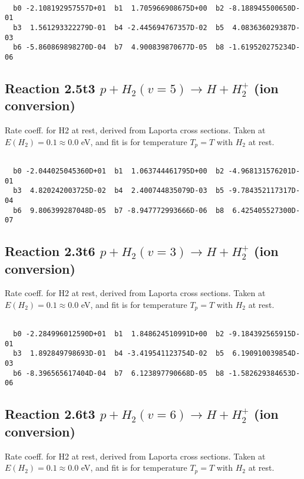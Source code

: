 \begin{small}\begin{verbatim}

  b0 -2.108192957557D+01  b1  1.705966908675D+00  b2 -8.188945500650D-01
  b3  1.561293322279D-01  b4 -2.445694767357D-02  b5  4.083636029387D-03
  b6 -5.860869898270D-04  b7  4.900839870677D-05  b8 -1.619520275234D-06

\end{verbatim}\end{small}

\newpage
\subsection{
Reaction 2.5t3
$ p + H_2(v=5) \rightarrow H + H_2^+$ (ion conversion)
}
Rate coeff. for H2 at rest, derived from Laporta cross sections.
Taken at $E(H_2) = 0.1 \approx 0.0$ eV,  and fit is for temperature $T_p=T$ with $H_2$ at rest.

\begin{small}\begin{verbatim}

  b0 -2.044025045360D+01  b1  1.063744461795D+00  b2 -4.968131576201D-01
  b3  4.820242003725D-02  b4  2.400744835079D-03  b5 -9.784352117317D-04
  b6  9.806399287048D-05  b7 -8.947772993666D-06  b8  6.425405527300D-07

\end{verbatim}\end{small}

\newpage
\subsection{
Reaction 2.3t6
$ p + H_2(v=3) \rightarrow H + H_2^+$ (ion conversion)
}
Rate coeff. for H2 at rest, derived from Laporta cross sections.
Taken at $E(H_2) = 0.1 \approx 0.0$ eV,  and fit is for temperature $T_p=T$ with $H_2$ at rest.

\begin{small}\begin{verbatim}

  b0 -2.284996012590D+01  b1  1.848624510991D+00  b2 -9.184392565915D-01
  b3  1.892849798693D-01  b4 -3.419541123754D-02  b5  6.190910039854D-03
  b6 -8.396565617404D-04  b7  6.123897790668D-05  b8 -1.582629384653D-06

\end{verbatim}\end{small}

\newpage
\subsection{
Reaction 2.6t3
$ p + H_2(v=6) \rightarrow H + H_2^+$ (ion conversion)
}
Rate coeff. for H2 at rest, derived from Laporta cross sections.
Taken at $E(H_2) = 0.1 \approx 0.0$ eV,  and fit is for temperature $T_p=T$ with $H_2$ at rest.

